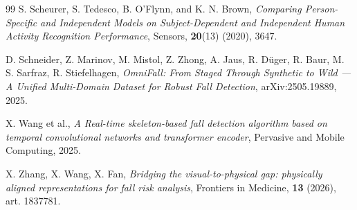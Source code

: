 \begin{thebibliography}{99}
 S. Scheurer, S. Tedesco, B. O'Flynn, and K. N. Brown,
{\it Comparing Person-Specific and Independent Models on Subject-Dependent
and Independent Human Activity Recognition Performance}, Sensors, {\bf 20}(13)
(2020), 3647.

 D. Schneider, Z. Marinov, M. Mistol, Z. Zhong, A. Jaus,
R. D\"uger, R. Baur, M. S. Sarfraz, R. Stiefelhagen, {\it OmniFall: From Staged
Through Synthetic to Wild --- A Unified Multi-Domain Dataset for Robust Fall
Detection}, arXiv:2505.19889, 2025.

 X. Wang et al., {\it A Real-time skeleton-based fall
detection algorithm based on temporal convolutional networks and
transformer encoder}, Pervasive and Mobile Computing, 2025.

 X. Zhang, X. Wang, X. Fan, {\it Bridging the visual-to-physical
gap: physically aligned representations for fall risk analysis}, Frontiers
in Medicine, {\bf 13} (2026), art. 1837781.

\end{thebibliography}





 




